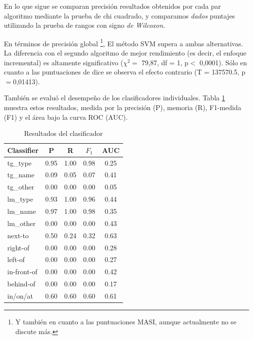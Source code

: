 En lo que sigue se comparan precisi\'on resultados obtenidos por cada par algoritmo mediante la prueba de chi cuadrado, y comparamos {\em dados} puntajes utilizando la prueba de rangos con signo {\em de Wilcoxon}.

En t\'erminos de precisi\'on global \footnote{Y tambi\'en en cuanto a las puntuaciones MASI, aunque actualmente no se discute m\'as.}, El m\'etodo SVM supera a ambas alternativas. La diferencia con el segundo algoritmo de mejor rendimiento (es decir, el enfoque incremental) es altamente significativo ($\chi^{2}=$ 79,87, df = 1, p$<$ 0,0001). S\'olo en cuanto a las puntuaciones de dice se observa el efecto contrario (T = 137570.5, p$=$0,01413).

Tambi\'en se evalu\'o el desempe\~no de los clasificadores individuales. Tabla \ref{tab-svm-results} muestra estos resultados, medida por la precisi\'on (P), memoria (R), F1-medida (F1) y el \'area bajo la curva ROC (AUC).

\begin{table}[H]
\begin{center}
\footnotesize{
\caption{Resultados del clasificador}
\begin{tabular}{l c c c c }
\hline
{{Classifier}}	& {P} & {R} & {$F_{1}$} & {AUC} \\
\hline
{{tg\_type}} 			& 0.95 & 1.00 & 0.98 & 0.25 \\
{{tg\_name}}			& 0.09 & 0.05 & 0.07 & 0.41 \\
{{tg\_other}}			& 0.00 & 0.00 & 0.00 & 0.05 \\                               
{{lm\_type}}			& 0.93 & 1.00 & 0.96 & 0.44 \\                               
{{lm\_name}}			& 0.97 & 1.00 & 0.98 & 0.35 \\                               
{{lm\_other}}			& 0.00 & 0.00 & 0.00 & 0.43 \\                               
{{next-to}}				& 0.50 & 0.24 & 0.32 & 0.63 \\                               
{{right-of}}			& 0.00 & 0.00 & 0.00 & 0.28 \\                               
{{left-of}}				& 0.00 & 0.00 & 0.00 & 0.27 \\                               
{{in-front-of}}		& 0.00 & 0.00 & 0.00 & 0.42 \\                               
{{behind-of}}			& 0.00 & 0.00 & 0.00 & 0.17 \\                               
{{in/on/at}} 			& 0.60 & 0.60 & 0.60 & 0.61 \\                               
\hline                   
\end{tabular}
\label{tab-svm-results}
}
\end{center}
\end{table}
\normalsize

